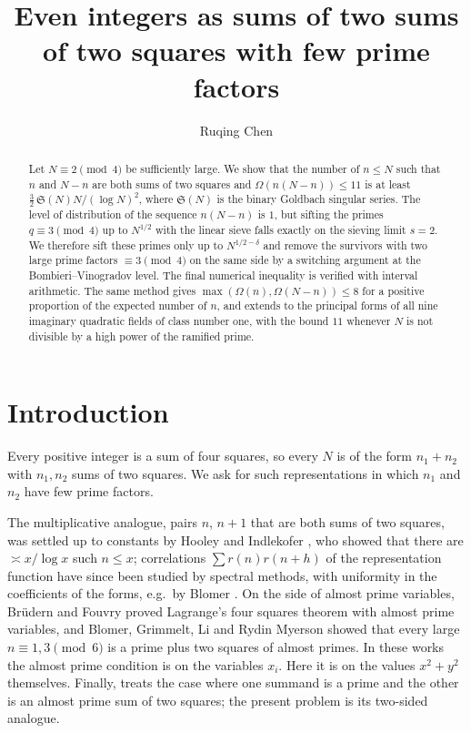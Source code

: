 \documentclass[11pt]{amsart}
\title[Sums of two almost prime sums of two squares]{Even integers as sums of two sums of two squares
with few prime factors}
\author{Ruqing Chen}
\theoremstyle{remark}
\newcommand{\Sg}{\mathfrak{S}}
\begin{document}
\begin{abstract}
Let $N\equiv 2\pmod 4$ be sufficiently large. We show that the number of $n\le N$ such that $n$
and $N-n$ are both sums of two squares and $\Omega(n(N-n))\le 11$ is at least
$\frac32\,\Sg(N)N/(\log N)^2$, where $\Sg(N)$ is the binary Goldbach singular series. The level of distribution
of the sequence $n(N-n)$ is $1$, but sifting the primes $q\equiv 3\pmod 4$ up to $N^{1/2}$ with the linear
sieve falls exactly on the sieving limit $s=2$. We therefore sift these primes only up to $N^{1/2-\delta}$
and remove the survivors with two large prime factors $\equiv 3\pmod 4$ on the same side by a switching
argument at the Bombieri--Vinogradov level. The final numerical inequality is verified with interval
arithmetic. The same method gives $\max(\Omega(n),\Omega(N-n))\le 8$ for a positive proportion of the
expected number of $n$, and extends to the principal forms of all nine imaginary quadratic fields of class
number one, with the bound $11$ whenever $N$ is not divisible by a high power of the ramified prime.
\end{abstract}

\maketitle

\section{Introduction}

Every positive integer is a sum of four squares, so every $N$ is of the form $n_1+n_2$ with $n_1,n_2$
sums of two squares. We ask for such representations in which $n_1$ and $n_2$ have few prime factors.

The multiplicative analogue, pairs $n$, $n+1$ that are both sums of two squares, was settled up to
constants by Hooley \cite{Hooley} and Indlekofer \cite{Indlekofer}, who showed that there are
$\asymp x/\log x$ such $n\le x$; correlations $\sum r(n)r(n+h)$ of the representation function have since
been studied by spectral methods, with uniformity in the coefficients of the forms, e.g.\ by
Blomer \cite{Blomer}. On the side of almost prime variables, Br\"udern and Fouvry \cite{BF} proved
Lagrange's four squares theorem with almost prime variables, and Blomer, Grimmelt, Li and Rydin Myerson
\cite{BGLR} showed that every large $n\equiv1,3\pmod 6$ is a prime plus two squares of almost primes. In
these works the almost prime condition is on the variables $x_i$. Here it is on the values $x^2+y^2$
themselves. Finally, \cite{Chen1} treats the case where one summand is a prime and the other is an almost
prime sum of two squares; the present problem is its two-sided analogue.
\end{document}
